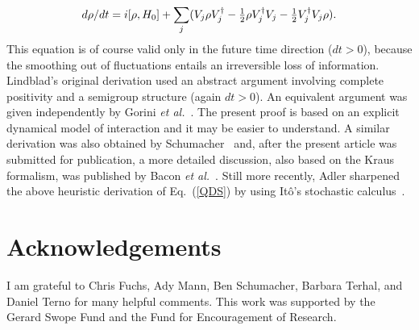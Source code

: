 \documentclass[12pt]{article}
\def\beq{\begin{equation}}
\def\eeq{\end{equation}}
\def\Eq{Eq.~(\ref}
\begin{document}
\beq d\rho/dt=i[\rho,H_0]+\sum_j(V_j\rho V_j^\dagger
 -\mbox{$1\over2$}\rho V_j^\dagger V_j
 -\mbox{$1\over2$}V_j^\dagger V_j\rho). \label{QDS} \eeq
This equation is of course valid only in the future time direction
($dt>0$), because the smoothing out of fluctuations entails an
irreversible loss of information. Lindblad's original derivation used an
abstract argument involving complete positivity and a semigroup
structure (again $dt>0$). An equivalent argument was given independently
by Gorini {\it et al.\/}~\cite{gorini}. The present proof is based on an
explicit dynamical model of interaction and it may be easier to
understand. A similar derivation was also obtained by
Schumacher~\cite{schu} and, after the present article was submitted for
publication, a more detailed discussion, also based on the Kraus
formalism, was published by Bacon {\it et al.\/}~\cite{bacon}. Still
more recently, Adler sharpened the above heuristic derivation of
\Eq{QDS}) by using It\^o's stochastic calculus~\cite{adler}.\bigskip

\section*{Acknowledgements}

I am grateful to Chris Fuchs, Ady Mann, Ben Schumacher, Barbara Terhal,
and Daniel Terno for many helpful comments. This work was supported by
the Gerard Swope Fund and the Fund for Encouragement of Research.
\clearpage
\end{document}
